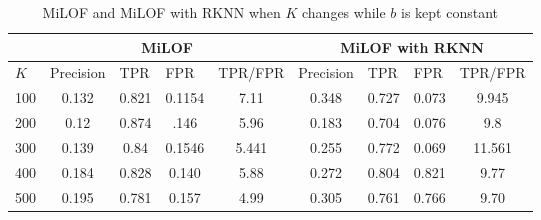 \begin{table}[H]
	\centering
	\caption{MiLOF and MiLOF with RKNN when $K$ changes while $b$ is kept constant}
	
	\label{my-label}
	\begin{tabular}{|c|c|c|c|c|c|c|c|c|}
		\hline
		\multicolumn{1}{|l|}{}    & \multicolumn{4}{c|}{MiLOF}                                                                                                    & \multicolumn{4}{c|}{MiLOF with RKNN}                                                                                          \\ \hline
		\multicolumn{1}{|l|}{$K$}   & \multicolumn{1}{l|}{Precision} & \multicolumn{1}{l|}{TPR} & \multicolumn{1}{l|}{FPR} & \multicolumn{1}{l|}{TPR/FPR} & \multicolumn{1}{l|}{Precision} & \multicolumn{1}{l|}{TPR} & \multicolumn{1}{l|}{FPR} & \multicolumn{1}{l|}{TPR/FPR} \\ \hline
		\multicolumn{1}{|l|}{100} & 0.132                          & 0.821                              & 0.1154                   & 7.11                         & 0.348                          & 0.727                              & 0.073                    & 9.945                        \\ \hline
		200                       & 0.12                           & 0.874                              & .146                     & 5.96                         & 0.183                          & 0.704                              & 0.076                    & 9.8                          \\ \hline
		300                       & 0.139                          & 0.84                               & 0.1546                   & 5.441                        & 0.255                          & 0.772                              & 0.069                    & 11.561                       \\ \hline
		400                       & 0.184                          & 0.828                              & 0.140                    & 5.88                         & 0.272                          & 0.804                              & 0.821                    & 9.77                         \\ \hline
		500                       & 0.195                          & 0.781                              & 0.157                    & 4.99                         & 0.305                          & 0.761                              & 0.766                    & 9.70                         \\ \hline

\end{tabular}
\end{table}
